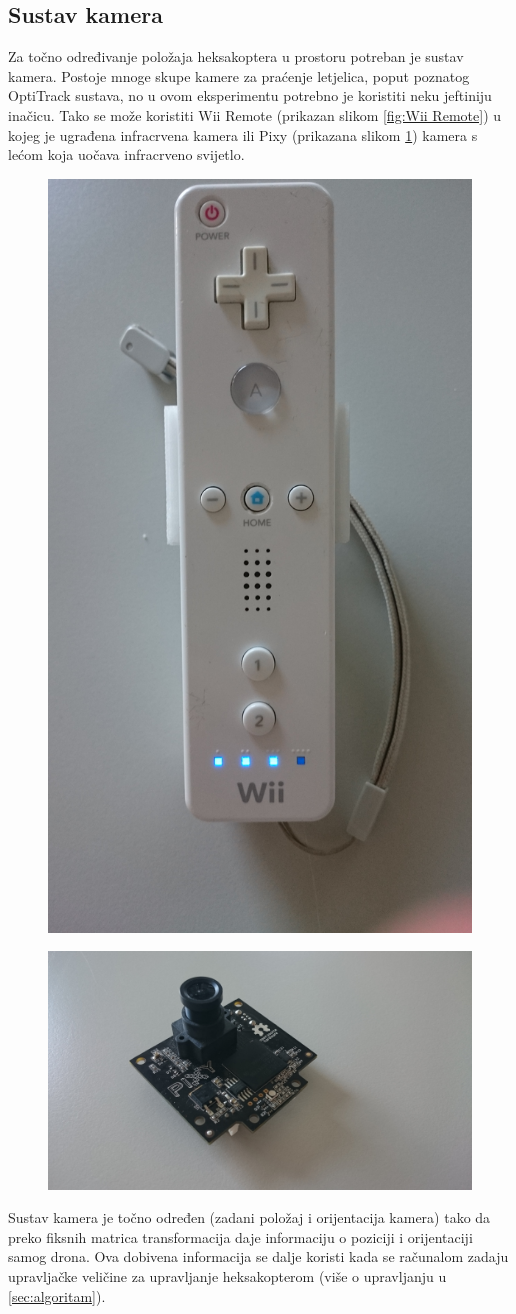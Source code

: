 \documentclass[times, utf8, diplomski]{fer}
\begin{document}
\subsection{Sustav kamera}\label{sec:kamera}
Za točno određivanje položaja heksakoptera u prostoru potreban je sustav kamera. Postoje mnoge skupe kamere za praćenje letjelica, poput poznatog OptiTrack sustava, no u ovom eksperimentu potrebno je koristiti neku jeftiniju inačicu. Tako se može koristiti Wii Remote (prikazan slikom \ref{fig:Wii Remote}) u kojeg je ugrađena infracrvena kamera ili Pixy (prikazana slikom \ref{fig:Pixy kamera}) kamera s lećom koja uočava infracrveno svijetlo. 
\begin{figure}[htb]
\centering
\begin{minipage}{.4\textwidth}
  \centering
  \includegraphics[width=.5\linewidth]{img/wiimote.JPG}
  \label{fig:Wii Remote}
\end{minipage}%
\begin{minipage}{.5\textwidth}
  \centering
  \includegraphics[width=.9\linewidth]{img/pixy.JPG}
  \label{fig:Pixy kamera}
\end{minipage}
\end{figure}
Sustav kamera je točno određen (zadani položaj i orijentacija kamera) tako da preko fiksnih matrica transformacija daje informaciju o poziciji i orijentaciji samog drona. Ova dobivena informacija se dalje koristi kada se računalom zadaju upravljačke veličine za upravljanje heksakopterom (više o upravljanju u \ref{sec:algoritam}).
\end{document}

